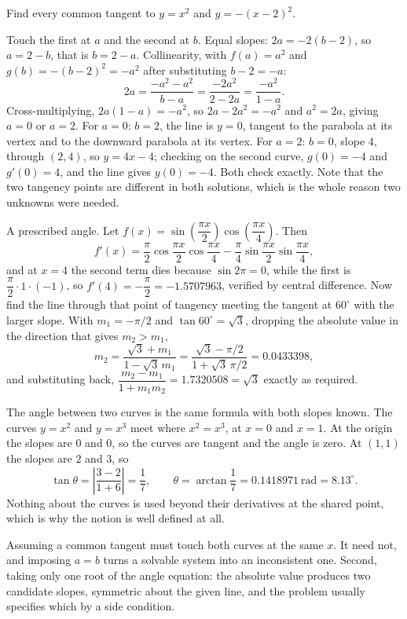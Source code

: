 \begin{worked}
Find every common tangent to $y=x^{2}$ and $y=-(x-2)^{2}$.

Touch the first at $a$ and the second at $b$. Equal slopes: $2a=-2(b-2)$, so $a=2-b$, that is $b=2-a$. Collinearity, with $f(a)=a^{2}$ and $g(b)=-(b-2)^{2}=-a^{2}$ after substituting $b-2=-a$:
\[
2a=\frac{-a^{2}-a^{2}}{b-a}=\frac{-2a^{2}}{2-2a}=\frac{-a^{2}}{1-a}.
\]
Cross-multiplying, $2a(1-a)=-a^{2}$, so $2a-2a^{2}=-a^{2}$ and $a^{2}=2a$, giving $a=0$ or $a=2$. For $a=0$: $b=2$, the line is $y=0$, tangent to the parabola at its vertex and to the downward parabola at its vertex. For $a=2$: $b=0$, slope $4$, through $(2,4)$, so $y=4x-4$; checking on the second curve, $g(0)=-4$ and $g'(0)=4$, and the line gives $y(0)=-4$. Both check exactly. Note that the two tangency points are different in both solutions, which is the whole reason two unknowns were needed.

A prescribed angle. Let $f(x)=\sin\!\left(\dfrac{\pi x}{2}\right)\cos\!\left(\dfrac{\pi x}{4}\right)$. Then
\[
f'(x)=\frac\pi2\cos\frac{\pi x}{2}\cos\frac{\pi x}{4}-\frac\pi4\sin\frac{\pi x}{2}\sin\frac{\pi x}{4},
\]
and at $x=4$ the second term dies because $\sin2\pi=0$, while the first is $\dfrac\pi2\cdot1\cdot(-1)$, so $f'(4)=-\dfrac\pi2=-1.5707963$, verified by central difference. Now find the line through that point of tangency meeting the tangent at $60^{\circ}$ with the larger slope. With $m_{1}=-\pi/2$ and $\tan60^{\circ}=\sqrt3$, dropping the absolute value in the direction that gives $m_{2}>m_{1}$,
\[
m_{2}=\frac{\sqrt3+m_{1}}{1-\sqrt3\,m_{1}}=\frac{\sqrt3-\pi/2}{1+\sqrt3\,\pi/2}=0.0433398 ,
\]
and substituting back, $\dfrac{m_{2}-m_{1}}{1+m_{1}m_{2}}=1.7320508=\sqrt3$ exactly as required.

The angle between two curves is the same formula with both slopes known. The curves $y=x^{2}$ and $y=x^{3}$ meet where $x^{2}=x^{3}$, at $x=0$ and $x=1$. At the origin the slopes are $0$ and $0$, so the curves are tangent and the angle is zero. At $(1,1)$ the slopes are $2$ and $3$, so
\[
\tan\theta=\left|\frac{3-2}{1+6}\right|=\frac17,\qquad\theta=\arctan\frac17=0.1418971\ \text{rad}=8.13^{\circ}.
\]
Nothing about the curves is used beyond their derivatives at the shared point, which is why the notion is well defined at all.
\end{worked}

\begin{trap}
Assuming a common tangent must touch both curves at the same $x$. It need not, and imposing $a=b$ turns a solvable system into an inconsistent one. Second, taking only one root of the angle equation: the absolute value produces two candidate slopes, symmetric about the given line, and the problem usually specifies which by a side condition.
\end{trap}

